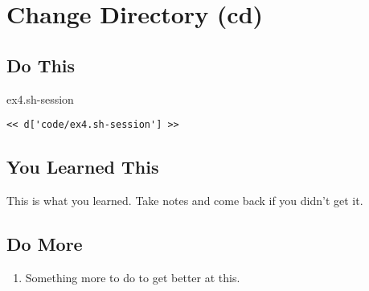 \chapter{Change Directory (cd)}

\section{Do This}

\begin{code}{ex4.sh-session}
\begin{Verbatim}
<< d['code/ex4.sh-session'] >>
\end{Verbatim}
\end{code}


\section{You Learned This}

This is what you learned.  Take notes and come back if you didn't get it.

\section{Do More}

\begin{enumerate}
\item Something more to do to get better at this.
\end{enumerate}

